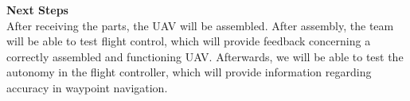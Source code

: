 \documentclass[11pt]{book}
\begin{document}
\vspace{6mm}
\noindent\large{\textbf{Next Steps}}\\	
\normalsize	
\noindent After receiving the parts, the UAV will be assembled. After assembly, the team will be able to test flight control, which will provide feedback concerning a correctly assembled and functioning UAV. Afterwards, we will be able to test the autonomy in the flight controller, which will provide information regarding accuracy in waypoint navigation. 
\end{document}
